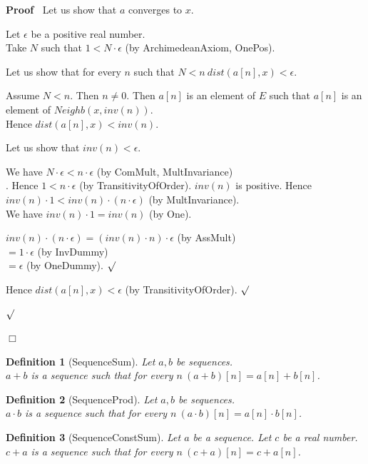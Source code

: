\documentclass{article}
\newenvironment{forthel}{\begin{leftbar}}{\end{leftbar}}
\newenvironment{proof}{\noindent\textbf{Proof\ }}{\hspace*{\fill}$\Box$\medskip}
\newenvironment{subproof}{\begin{list}{}{}
		\item[\text{Proof}]}{\hfill $\surd$ \end{list}}
\newtheorem{definition}{Definition}
\newcommand{\cdotone}{\cdot}
\newcommand{\plusone}{+}
\newcommand{\plustwo}{+}
\newcommand{\dotequal}{=}
\begin{document}
\begin{forthel}
\begin{proof}
		\noindent Let us show that $a$ converges to $x$.
		\begin{subproof}
			Let $\epsilon$ be a positive real number.\\
			Take $N$ such that $1 < N \cdot \epsilon$ (by ArchimedeanAxiom, OnePos).
			
			\noindent Let us show that for every $n$ such that $N < n \ dist(a[n],x) < \epsilon$.
			\begin{subproof}
				Assume $N < n$. Then $n \neq 0$.
				Then $a[n]$ is an element of $E$ such that $a[n]$ is an element of $Neighb(x,inv(n))$.\\
				Hence $dist(a[n],x) < inv(n)$.
				
				\noindent Let us show that $inv(n) < \epsilon$.
				\begin{subproof}
					We have $N \cdot \epsilon < n \cdot \epsilon$ (by ComMult, MultInvariance)\\.
					Hence $1 < n \cdot \epsilon$ (by 	TransitivityOfOrder).
					$inv(n)$ is positive.
					Hence $inv(n) \cdot 1 < inv(n) \cdot (n \cdot \epsilon)$ (by MultInvariance).\\
					We have $inv(n) \cdot 1 = inv(n)$ (by One).
					
					$inv(n) \cdot (n \cdot \epsilon) \dotequal 		(inv(n) \cdot n) \cdot \epsilon$ (by AssMult)\\
					$\dotequal 1 \cdot \epsilon$ (by InvDummy)\\
					$\dotequal \epsilon$ (by OneDummy).
				\end{subproof}
				Hence $dist(a[n],x) < \epsilon$ (by 		TransitivityOfOrder).
			\end{subproof}
		\end{subproof}
	\end{proof}
	
	\begin{definition}[SequenceSum]
	Let $a,b$ be sequences. \\$a \plusone b$ is a sequence such that for every $n \ (a \plusone b)[n] = a[n] + b[n]$.
	\end{definition}
	
	\begin{definition}[SequenceProd]
	Let $a,b$ be sequences. \\$a \cdotone b$ is a sequence such that for every $n \ (a \cdotone b)[n] = a[n] \cdot b[n]$.
	\end{definition}
	
	\begin{definition}[SequenceConstSum]
	Let $a$ be a sequence. Let $c$ be a real number. $c \plustwo a$ is a sequence such that for every $n \ (c \plustwo a)[n] = c + a[n]$.
	\end{definition}
	

\end{forthel}
\end{document}
